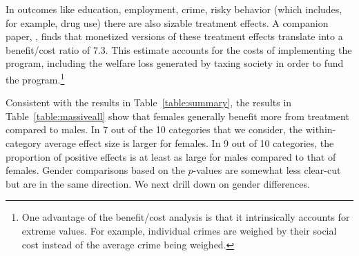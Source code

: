In outcomes like education, employment, crime, risky behavior (which includes, for example, drug use) there are also sizable treatment effects. A companion paper, \citet{Garcia_Heckman_Leaf_etal_2017_Comp_CBA_Unpublished}, finds that monetized versions of these treatment effects translate into a benefit/cost ratio of $7.3$. This estimate accounts for the costs of implementing the program, including the welfare loss generated by taxing society in order to fund the program.\footnote{One advantage of the benefit/cost analysis is that it intrinsically accounts for extreme values. For example, individual crimes are weighed by their social cost instead of the average crime being weighed.}

Consistent with the results in Table~\ref{table:summary}, the results in Table~\ref{table:massiveall} show that females generally benefit more from treatment compared to males. In 7 out of the 10 categories that we consider, the within-category average effect size is larger for females. In 9 out of 10 categories, the proportion of positive effects is at least as large for males compared to that of females. Gender comparisons based on the \citet{Rosenbaum_2005_Distribution_JRSS} $p$-values are somewhat less clear-cut but are in the same direction. We next drill down on gender differences.


